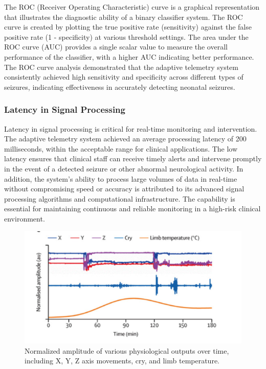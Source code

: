 \documentclass[12pt,journal,compsoc]{IEEEtran}
\begin{document}
The ROC (Receiver Operating Characteristic) curve is a graphical representation that illustrates the diagnostic ability of a binary classifier system. The ROC curve is created by plotting the true positive rate (sensitivity) against the false positive rate (1 - specificity) at various threshold settings. The area under the ROC curve (AUC) provides a single scalar value to measure the overall performance of the classifier, with a higher AUC indicating better performance. The ROC curve analysis demonstrated that the adaptive telemetry system consistently achieved high sensitivity and specificity across different types of seizures, indicating effectiveness in accurately detecting neonatal seizures.

\subsubsection{Latency in Signal Processing}

Latency in signal processing is critical for real-time monitoring and intervention. The adaptive telemetry system achieved an average processing latency of 200 milliseconds, within the acceptable range for clinical applications. The low latency ensures that clinical staff can receive timely alerts and intervene promptly in the event of a detected seizure or other abnormal neurological activity. In addition, the system's ability to process large volumes of data in real-time without compromising speed or accuracy is attributed to its advanced signal processing algorithms and computational infrastructure. The capability is essential for maintaining continuous and reliable monitoring in a high-risk clinical environment.

\begin{figure}[H]
    \centering
    \includegraphics[width=0.8\linewidth]{physiological_outputs.png}
    \caption{Normalized amplitude of various physiological outputs over time, including X, Y, Z axis movements, cry, and limb temperature. }
    \label{fig:physiological_outputs}
\end{figure}
\end{document}
